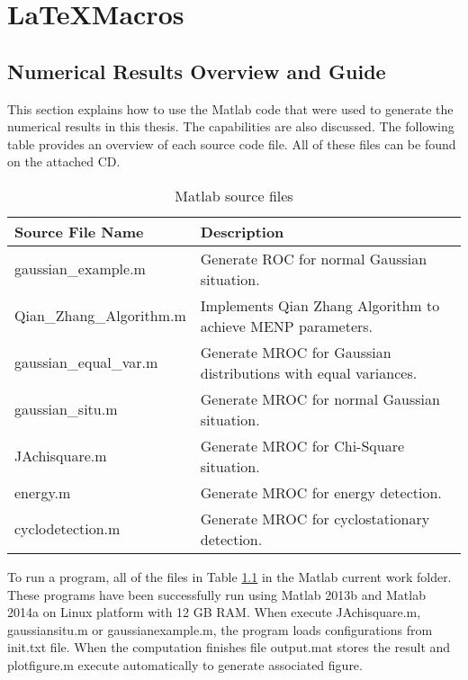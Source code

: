 \resetdatestamp

\chapter{\LaTeX{}Macros}
\label{A:LaTeXmacros}

\section{Numerical Results Overview and Guide }
This section explains how to use the Matlab code that were used to generate the numerical results in this thesis. The capabilities are also discussed. The following table provides an overview of each source code file. All of these files can be found on the attached CD. 

\begin{table}[h]
\begin{tabular}{ll}
\hline
\hline
Source File Name                  & Description                                                                \\ \hline
gaussian\_example.m      & Generate ROC for normal Gaussian situation.              \\
Qian\_Zhang\_Algorithm.m & Implements Qian Zhang Algorithm to achieve MENP parameters.                \\
gaussian\_equal\_var.m   & Generate MROC for Gaussian distributions with equal variances. \\
gaussian\_situ.m         & Generate MROC for normal Gaussian situation.                   \\
JAchisquare.m            & Generate MROC for Chi-Square situation.                        \\
energy.m                 & Generate MROC for energy detection.                            \\
cyclodetection.m         & Generate MROC for cyclostationary detection.                 \\ 
\hline
\end{tabular}
\label{filelist}
\caption{Matlab source files}
\end{table}

To run a program, all of the files in Table \ref{filelist} in the Matlab current work folder. These programs have been successfully run using Matlab 2013b and Matlab 2014a on Linux platform with 12 GB RAM.  When execute JAchisquare.m, gaussiansitu.m or gaussianexample.m, the program loads configurations from init.txt file. When the computation finishes file output.mat stores the result and plotfigure.m execute automatically to generate associated figure. 

